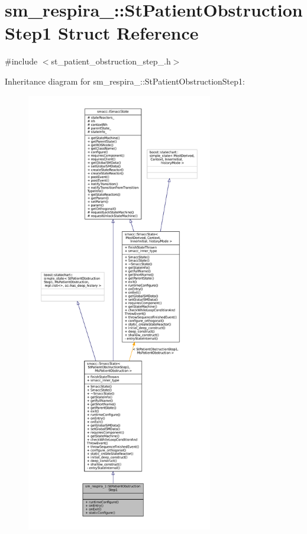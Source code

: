 \hypertarget{structsm__respira__1_1_1StPatientObstructionStep1}{}\section{sm\+\_\+respira\+\_\+:\+:St\+Patient\+Obstruction\+Step1 Struct Reference}
\label{structsm__respira__1_1_1StPatientObstructionStep1}


{\ttfamily \#include $<$st\+\_\+patient\+\_\+obstruction\+\_\+step\+\_.\+h$>$}



Inheritance diagram for sm\+\_\+respira\+\_\+:\+:St\+Patient\+Obstruction\+Step1\+:
\nopagebreak
\begin{figure}[H]
\begin{center}
\leavevmode
\includegraphics[height=550pt]{structsm__respira__1_1_1StPatientObstructionStep1__inherit__graph}
\end{center}
\end{figure}


